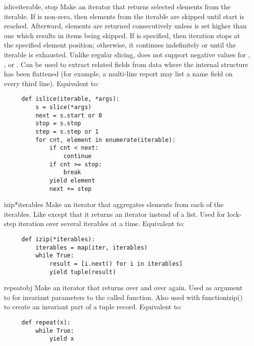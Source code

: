 \begin{funcdesc}{islice}{iterable,  stop }
  Make an iterator that returns selected elements from the iterable.
  If  is non-zero, then elements from the iterable are skipped
  until start is reached.  Afterward, elements are returned consecutively
  unless  is set higher than one which results in items being
  skipped.  If  is specified, then iteration stops at the
  specified element position; otherwise, it continues indefinitely or
  until the iterable is exhausted.  Unlike regular slicing,
   does not support negative values for ,
  , or .  Can be used to extract related fields
  from data where the internal structure has been flattened (for
  example, a multi-line report may list a name field on every
  third line).  Equivalent to:

  \begin{verbatim}
     def islice(iterable, *args):
         s = slice(*args)
         next = s.start or 0
         stop = s.stop
         step = s.step or 1
         for cnt, element in enumerate(iterable):
             if cnt < next:
                 continue
             if cnt >= stop:
                 break
             yield element
             next += step
  \end{verbatim}
\end{funcdesc}

\begin{funcdesc}{izip}{*iterables}
  Make an iterator that aggregates elements from each of the iterables.
  Like  except that it returns an iterator instead of
  a list.  Used for lock-step iteration over several iterables at a
  time.  Equivalent to:

  \begin{verbatim}
     def izip(*iterables):
         iterables = map(iter, iterables)
         while True:
             result = [i.next() for i in iterables]
             yield tuple(result)
  \end{verbatim}
\end{funcdesc}

\begin{funcdesc}{repeat}{obj}
  Make an iterator that returns  over and over again.
  Used as argument to  for invariant parameters
  to the called function.  Also used with function{izip()} to create
  an invariant part of a tuple record.  Equivalent to:

  \begin{verbatim}
     def repeat(x):
         while True:
             yield x
  \end{verbatim}
\end{funcdesc}

